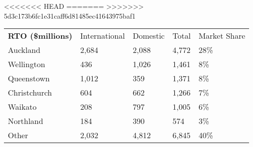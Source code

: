 <<<<<<< HEAD
=======
>>>>>>> 5d3c173b6fc1e31caff6d81485ec41643975baf1
\begin{tabular}[t]{p{2cm}>{\hfill}p{1.45cm}>{\hfill}p{1cm}>{\hfill}p{0.9cm}>{\hfill}p{1.35cm}}
 \textbf{RTO (\$millions)} & International & Domestic & Total & Market Share \\ 
 Auckland & 2,684 & 2,088 & 4,772 & 28\% \\ 
  Wellington & 436 & 1,026 & 1,461 & 8\% \\ 
  Queenstown & 1,012 & 359 & 1,371 & 8\% \\ 
  Christchurch & 604 & 662 & 1,266 & 7\% \\ 
  Waikato & 208 & 797 & 1,005 & 6\% \\ 
  Northland & 184 & 390 & 574 & 3\% \\ 
  Other & 2,032 & 4,812 & 6,845 & 40\% \\ 
  \end{tabular}
